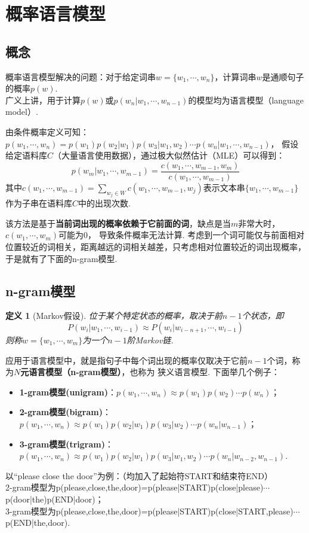 \documentclass[12pt, a4paper, oneside]{ctexart}
\newtheorem{definition}{定义}
\numberwithin{equation}{section}  %
\begin{document}
\section{概率语言模型}
\subsection{概念}
概率语言模型解决的问题：对于给定词串$w = \{w_1,\cdots, w_n\}$，计算词串$w$是通顺句子的概率$p(w)$.\\
广义上讲，用于计算$p(w)$或$p(w_n|w_1,\cdots, w_{n-1})$的模型均为语言模型（language model）.

由条件概率定义可知：$p(w_1,\cdots, w_n) = p(w_1)p(w_2|w_1)p(w_3|w_1,w_2)\cdots p(w_n|w_1,\cdots, w_{n-1})$，
假设给定语料库$C$（大量语言使用数据），通过极大似然估计（MLE）可以得到：
\begin{equation*}
    p(w_m|w_1,\cdots,w_{m-1}) = \frac{c(w_1,\cdots, w_{m-1},w_m)}{c(w_1,\cdots, w_{m-1})}
\end{equation*}
其中$c(w_1,\cdots, w_{m-1}) = \sum_{w_j\in W}c(w_1,\cdots, w_{m-1}, w_j)$表示文本串$\{w_1,\cdots, w_{m-1}\}$
作为子串在语料库$C$中的出现次数.

该方法是基于\textbf{当前词出现的概率依赖于它前面的词}，缺点是当$m$非常大时，$c(w_1,\cdots, w_m)$可能为$0$，
导致条件概率无法计算. 考虑到一个词可能仅与前面相对位置较近的词相关，距离越远的词相关越差，只考虑相对位置较近的词出现概率，
于是就有了下面的n-gram模型.
\subsection{n-gram模型}
\begin{definition}[Markov假设]
    位于某个特定状态的概率，取决于前$n-1$个状态，即
    \begin{equation*}
        P(w_i|w_1,\cdots, w_{i-1})\approx P(w_i | w_{i-n+1},\cdots,w_{i-1})
    \end{equation*}
    则称$w = \{w_1,\cdots, w_m\}$为一个$n-1$阶Markov链.
\end{definition}
应用于语言模型中，就是指句子中每个词出现的概率仅取决于它前$n-1$个词，称为\textbf{$N$元语言模型（n-gram模型）}，也称为
狭义语言模型. 下面举几个例子：
\begin{itemize}
    \item \textbf{1-gram模型(unigram)}：$p(w_1,\cdots, w_n)\approx p(w_1)p(w_2)\cdots p(w_n)$；
    \item \textbf{2-gram模型(bigram)}：$p(w_1,\cdots, w_n)\approx p(w_1)p(w_2|w_1)p(w_3|w_2)\cdots p(w_n|w_{n-1})$；
    \item \textbf{3-gram模型(trigram)}：$p(w_1,\cdots, w_n)\approx p(w_1)p(w_2|w_1)p(w_3|w_1,w_2)\cdots p(w_n|w_{n-2},w_{n-1})$.
\end{itemize}
\noindent 以“please close the door”为例：（均加入了起始符START和结束符END）\\
2-gram模型为p(please,close,the,door)=p(please|START)p(close|please)$\cdots$p(door|the)p(END|door)；\\
3-gram模型为p(please,close,the,door)=p(please|START)p(close|START,please)$\cdots$p(END|the,door).
\end{document}
